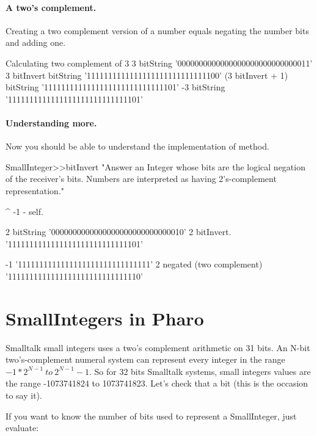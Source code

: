 \documentclass[a4paper,10pt,twoside]{book}
\begin{document}
\paragraph{A two's complement.}

Creating a two complement version of a number equals negating the number bits and adding one.
\begin{code}{Calculating two complement of 3}
3 bitString '0000000000000000000000000000011'
3 bitInvert bitString '1111111111111111111111111111100'
(3 bitInvert + 1) bitString '1111111111111111111111111111101'
-3 bitString '1111111111111111111111111111101'
\end{code}

\paragraph{Understanding more.}
Now you should be able to understand the implementation of  method.

\begin{code}{}
SmallInteger>>bitInvert
    "Answer an Integer whose bits are the logical negation of the receiver's bits.
    Numbers are interpreted as having 2's-complement representation."

	^ -1 - self.
\end{code}

\begin{code}{}
2 bitString
	'0000000000000000000000000000010'
2 bitInvert.
	'1111111111111111111111111111101'
	
-1 
	'1111111111111111111111111111111'
2 negated (two complement)
	'1111111111111111111111111111110'
\end{code}






\section{SmallIntegers in Pharo}

Smalltalk small integers uses a two's complement arithmetic on 31 bits.  
An N-bit two's-complement numeral system can represent every integer in the range $-1 * 2^{N-1}\ to\ 2^{N-1}-1$. So for 32 bits Smalltalk systems, small integers values are the range -1073741824 to  1073741823. Let's check that a bit (this is the occasion to say it). 



If you want to know the number of bits used to represent a
SmallInteger, just evaluate:
\end{document}
